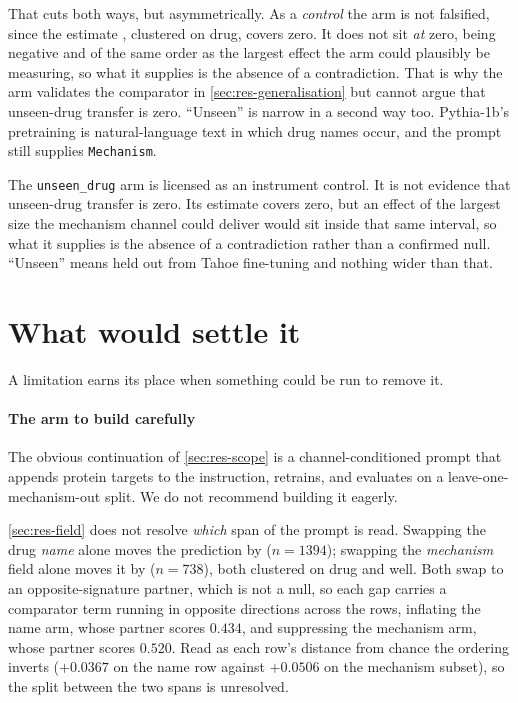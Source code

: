 

That cuts both ways, but asymmetrically. As a \emph{control} the arm is not
falsified, since the estimate , clustered on drug,
covers zero. It does not sit \emph{at} zero, being negative and of the same
order as the largest effect the arm could plausibly be measuring, so what it
supplies is the absence of a contradiction. That is why the arm validates the
comparator in \cref{sec:res-generalisation} but cannot argue that unseen-drug
transfer is zero. ``Unseen'' is narrow in a second way too. Pythia-1b's
pretraining is natural-language text in which drug names occur, and the
prompt still supplies \texttt{Mechanism}.

\begin{scopelimit}
The \texttt{unseen\_drug} arm is licensed as an instrument control. It is not
evidence that unseen-drug transfer is zero. Its estimate covers zero, but an
effect of the largest size the mechanism channel could deliver would sit inside
that same interval, so what it supplies is the absence of a contradiction rather
than a confirmed null. ``Unseen'' means held out from Tahoe fine-tuning and
nothing wider than that.
\end{scopelimit}

\section{What would settle it}

A limitation earns its place when something could be run to remove it.

\paragraph{The arm to build carefully} The obvious continuation of
\cref{sec:res-scope} is a channel-conditioned prompt that appends protein
targets to the instruction, retrains, and evaluates on a leave-one-mechanism-out
split. We do not recommend building it eagerly.

\cref{sec:res-field} does not resolve \emph{which} span of the prompt is read.
Swapping the drug \emph{name} alone moves the prediction by
 ($n = \num{1394}$); swapping the \emph{mechanism}
field alone moves it by  ($n = \num{738}$), both
clustered on drug and well. Both swap to an opposite-signature partner, which is
not a null, so each gap carries a comparator term running in opposite directions
across the rows, inflating the name arm, whose partner scores $0.434$, and
suppressing the mechanism arm, whose partner scores $0.520$. Read as each row's
distance from chance the ordering inverts ($+0.0367$ on the name row against
$+0.0506$ on the mechanism subset), so the split between the two spans is
unresolved.

